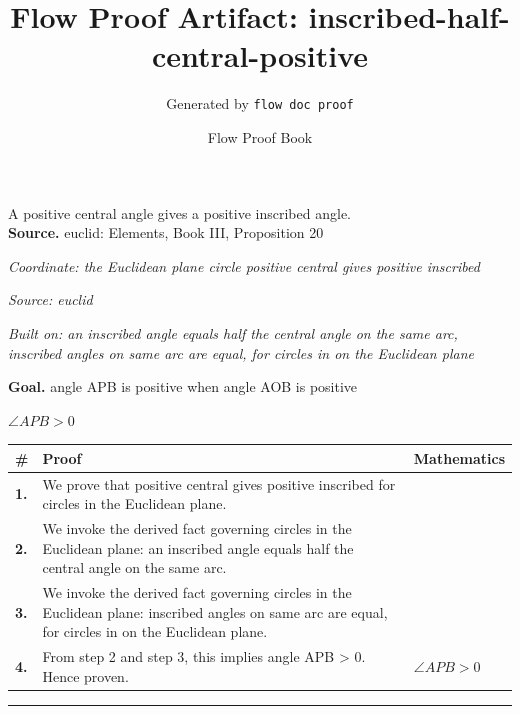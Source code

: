 \documentclass[11pt]{article}
\title{Flow Proof Artifact: inscribed-half-central-positive}
\author{Generated by \texttt{flow doc proof}}
\date{Flow Proof Book}
\theoremstyle{definition}
\begin{document}
\maketitle
A positive central angle gives a positive inscribed angle.\\[0.5em]
\textbf{Source.} euclid: Elements, Book III, Proposition 20\\[0.5em]
\bigskip
{}\par
\smallskip\noindent\textit{Coordinate: the Euclidean plane \cdot circle \cdot positive central gives positive inscribed}\par
\smallskip\noindent\textit{Source: euclid}\par
\smallskip\noindent\textit{Built on: an inscribed angle equals half the central angle on the same arc, inscribed angles on same arc are equal, for circles in on the Euclidean plane}\par
\medskip
\noindent\textbf{Goal.} angle APB is positive when angle AOB is positive\par
\noindent$\displaystyle \angle APB > 0$\par
\medskip
\noindent
\begin{tabular}{@{} >{\raggedright\arraybackslash}p{} >{\raggedright\arraybackslash}p{} >{\raggedleft\arraybackslash}p{} @{}}
\textbf{\#} & \textbf{Proof} & \textbf{Mathematics} \\
\midrule
\textbf{1.} & We prove that positive central gives positive inscribed for circles in the Euclidean plane. & \\[0.45em]
\textbf{2.} & We invoke the derived fact governing circles in the Euclidean plane: an inscribed angle equals half the central angle on the same arc. & \\[0.45em]
\textbf{3.} & We invoke the derived fact governing circles in the Euclidean plane: inscribed angles on same arc are equal, for circles in on the Euclidean plane. & \\[0.45em]
\textbf{4.} & From step 2 and step 3, this implies angle APB > 0. Hence proven. & $\displaystyle \angle APB > 0$ \\[0.45em]
\bottomrule
\end{tabular}
\label{thm:Geometry-circle-positive_central_gives_positive_inscribed}
\par\medskip\hrule
\end{document}
